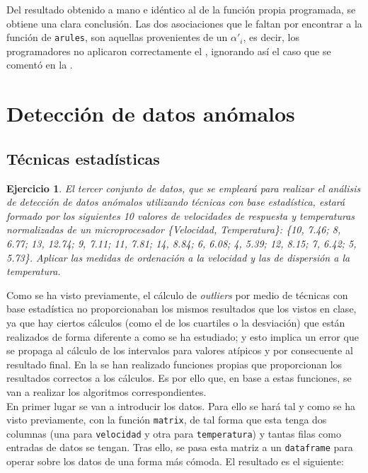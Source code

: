 \documentclass[12pt]{report}\usepackage[]{graphicx}\usepackage[dvipsnames]{xcolor}
\newtheorem{exercise}{Ejercicio}[section]
\begin{document}
			Del resultado obtenido a mano e idéntico al de la función propia programada, se obtiene una clara conclusión. Las dos asociaciones que le faltan por encontrar a la función de \texttt{arules}, son aquellas provenientes de un $\alpha'_i$, es decir, los programadores no aplicaron correctamente el , ignorando así el caso que se comentó en la . 
		
		\section{Detección de datos anómalos}
		
			\subsection{Técnicas estadísticas}
			
				\begin{exercise}
					El tercer conjunto de datos, que se empleará para realizar el análisis de detección de datos anómalos utilizando técnicas con base estadística, estará formado por los siguientes 10 valores de velocidades de respuesta y temperaturas normalizadas de un microprocesador \{Velocidad, Temperatura\}: \{10, 7.46; 8, 6.77; 13, 12.74; 9, 7.11; 11, 7.81; 14, 8.84; 6, 6.08; 4, 5.39; 12, 8.15; 7, 6.42; 5, 5.73\}. Aplicar las medidas de ordenación a la velocidad y las de dispersión a la temperatura.
				\end{exercise}
				
				Como se ha visto previamente, el cálculo de \textit{outliers} por medio de técnicas con base estadística no proporcionaban los mismos resultados que los vistos en clase, ya que hay ciertos cálculos (como el de los cuartiles o la desviación) que están realizados de forma diferente a como se ha estudiado; y esto implica un error que se propaga al cálculo de los intervalos para valores atípicos y por consecuente al resultado final.  En la  se han realizado funciones propias que proporcionan los resultados correctos a los cálculos. Es por ello que, en base a estas funciones, se van a realizar los algoritmos correspondientes.\\
				
				En primer lugar se van a introducir los datos. Para ello se hará tal y como se ha visto previamente, con la función \texttt{matrix}, de tal forma que esta tenga dos columnas (una para \texttt{velocidad} y otra para \texttt{temperatura}) y tantas filas como entradas de datos se tengan. Tras ello, se pasa esta matriz a un \texttt{dataframe} para operar sobre los datos de una forma más cómoda. El resultado es el siguiente: 
				
\end{document}
